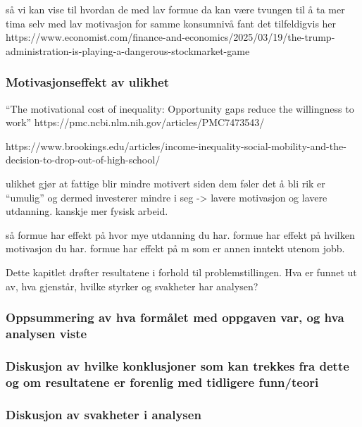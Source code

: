 \documentclass[
  12pt,
  a4paper,
  DIV=11,
  numbers=noendperiod]{scrartcl}
\begin{document}
så vi kan vise til hvordan de med lav formue da kan være tvungen til å
ta mer tima selv med lav motivasjon for samme konsumnivå fant det
tilfeldigvis her
https://www.economist.com/finance-and-economics/2025/03/19/the-trump-administration-is-playing-a-dangerous-stockmarket-game

\subsubsection{Motivasjonseffekt av
ulikhet}\label{motivasjonseffekt-av-ulikhet}

``The motivational cost of inequality: Opportunity gaps reduce the
willingness to work'' https://pmc.ncbi.nlm.nih.gov/articles/PMC7473543/

https://www.brookings.edu/articles/income-inequality-social-mobility-and-the-decision-to-drop-out-of-high-school/

ulikhet gjør at fattige blir mindre motivert siden dem føler det å bli
rik er ``umulig'' og dermed investerer mindre i seg -\textgreater{}
lavere motivasjon og lavere utdanning. kanskje mer fysisk arbeid.

så formue har effekt på hvor mye utdanning du har. formue har effekt på
hvilken motivasjon du har. formue har effekt på m som er annen inntekt
utenom jobb.

Dette kapitlet drøfter resultatene i forhold til problemstillingen. Hva
er funnet ut av, hva gjenstår, hvilke styrker og svakheter har analysen?

\subsubsection{Oppsummering av hva formålet med oppgaven var, og hva
analysen
viste}\label{oppsummering-av-hva-formuxe5let-med-oppgaven-var-og-hva-analysen-viste}

\subsubsection{Diskusjon av hvilke konklusjoner som kan trekkes fra
dette og om resultatene er forenlig med tidligere
funn/teori}\label{diskusjon-av-hvilke-konklusjoner-som-kan-trekkes-fra-dette-og-om-resultatene-er-forenlig-med-tidligere-funnteori}

\subsubsection{Diskusjon av svakheter i
analysen}\label{diskusjon-av-svakheter-i-analysen}
\end{document}
